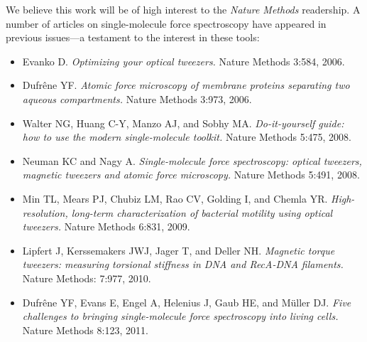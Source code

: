 \documentclass[ucb,qb3,10pt,fullfrom]{ucletter}
\begin{document}
\begin{letter}{}
We believe this work will be of high interest to the \emph{Nature Methods} readership.
A number of articles on single-molecule force spectroscopy have appeared in previous issues---a testament to the interest in these tools:
\begin{itemize}
  \item Evanko D. \emph{Optimizing your optical tweezers.} Nature Methods 3:584, 2006.
  \item Dufr\^{e}ne YF. \emph{Atomic force microscopy of membrane proteins separating two aqueous compartments.} Nature Methods 3:973, 2006.
  \item Walter NG, Huang C-Y, Manzo AJ, and Sobhy MA. \emph{Do-it-yourself guide: how to use the modern single-molecule toolkit.} Nature Methods 5:475, 2008.
  \item Neuman KC and Nagy A. \emph{Single-molecule force spectroscopy: optical tweezers, magnetic tweezers and atomic force microscopy.} Nature Methods 5:491, 2008.
  \item Min TL, Mears PJ, Chubiz LM, Rao CV, Golding I, and Chemla YR. \emph{High-resolution, long-term characterization of bacterial motility using optical tweezers.} Nature Methods 6:831, 2009.
  \item Lipfert J, Kerssemakers JWJ, Jager T, and Deller NH. \emph{Magnetic torque tweezers: measuring torsional stiffness in DNA and RecA-DNA filaments.} Nature Methods: 7:977, 2010.
  \item Dufr\^{e}ne YF, Evans E, Engel A, Helenius J, Gaub HE, and M\"{u}ller DJ. \emph{Five challenges to bringing single-molecule force spectroscopy into living cells.} Nature Methods 8:123, 2011.
\end{itemize}


\eject


\end{letter}
\end{document}
